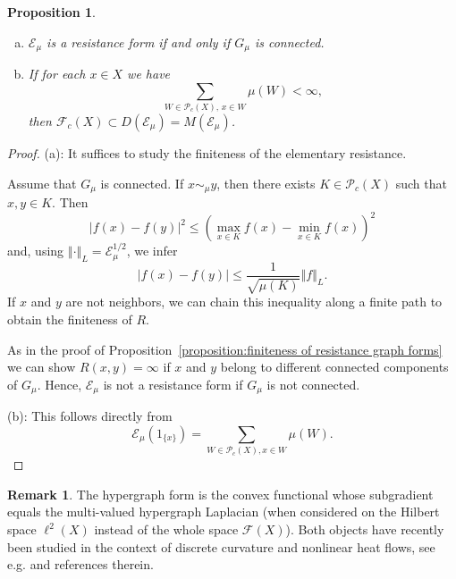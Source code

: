 \documentclass[a4paper,11pt,reqno]{amsart}
\newtheorem{proposition}[lemma]{Proposition}
\theoremstyle{definition}
\newtheorem{remark}[lemma]{Remark}
\numberwithin{equation}{section}
\newcommand{\cE}{{\mathcal E}}
\newcommand{\cF}{{\mathcal F}}
\newcommand{\R}{{\mathbb R}}
\newcommand{\av}[1]{\left\Vert #1\right\Vert}
\newcommand{\1}{\mathds{1}}
\begin{document}
\begin{proposition} \label{proposition:hypergraph form}
\begin{enumerate}[(a)]
 \item $\cE_\mu$ is a resistance form if and only if $G_\mu$ is connected.
 \item If for each $x \in X$ we have
 $$\sum_{W \in \mathcal P_c(X),\, x \in W} \mu(W) < \infty,$$
 then $\cF_c(X) \subset D(\cE_\mu) = M(\cE_\mu)$.
\end{enumerate}
 
\end{proposition}

\begin{proof}
(a): It suffices to study the finiteness of the elementary resistance. 

Assume that $G_\mu$ is connected.  If $x \sim_\mu y$, then there exists $K \in \mathcal P_c(X)$ such that $x,y \in K$. Then
%
$$|f(x) - f(y)|^2 \leq (\max_{x \in K} f(x) - \min_{x \in K} f(x))^2$$
%
and, using $\av{\cdot}_L = \cE_\mu^{1/2}$, we infer 
%
$$|f(x) - f(y)| \leq \frac{1}{\sqrt{\mu(K)}}\av{f}_L. $$
%
If $x$ and $y$ are not neighbors, we can chain this inequality along a finite path to obtain the finiteness of $R$. 

As in the proof of Proposition~\ref{proposition:finiteness of resistance graph forms} we can show $R(x,y) = \infty$ if $x$ and $y$ belong to different connected components of $G_\mu$. Hence, $\cE_\mu$ is not a resistance form if $G_\mu$ is not connected. 

(b): This follows directly from 
%
$$\cE_\mu(1_{\{x\}}) = \sum_{W \in \mathcal P_c(X), x \in W} \mu(W).$$
%
\end{proof}

\begin{remark}
 The hypergraph form is the convex functional whose subgradient equals the multi-valued hypergraph Laplacian (when considered on the Hilbert space $\ell^2(X)$ instead of the whole space $\cF(X)$). Both objects have recently been studied in the context of discrete curvature and nonlinear heat flows, see e.g. \cite{HG1,HG2,HG3,HG4,HG5} and references therein.  
\end{remark}




% 
% 

% 
\end{document}
